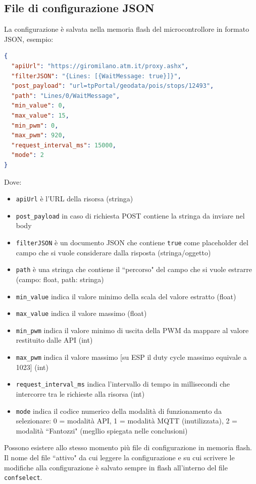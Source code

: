 \documentclass[12pt,a4paper]{report}
\begin{document}
\subsection{File di configurazione JSON}
La configurazione è salvata nella memoria flash del microcontrollore
in formato JSON, esempio:

\begin{lstlisting}[language=json,firstnumber=1]
{
  "apiUrl": "https://giromilano.atm.it/proxy.ashx",
  "filterJSON": "{Lines: [{WaitMessage: true}]}",
  "post_payload": "url=tpPortal/geodata/pois/stops/12493",
  "path": "Lines/0/WaitMessage",
  "min_value": 0,
  "max_value": 15,
  "min_pwm": 0,
  "max_pwm": 920,
  "request_interval_ms": 15000,
  "mode": 2
}
\end{lstlisting}


\noindent Dove:
\begin{itemize}
  \item \texttt{apiUrl} è l'URL della risorsa (stringa)
  \item \texttt{post_payload} in caso di richiesta POST contiene la stringa da inviare nel body
  \item \texttt{filterJSON} è un documento JSON che contiene \texttt{true} come placeholder del campo che si vuole considerare dalla risposta (stringa/oggetto)
  \item \texttt{path} è una stringa che contiene il ``percorso" del campo che si vuole estrarre (campo: float, path: stringa)
  \item \texttt{min_value} indica il valore minimo della scala del valore estratto (float)
  \item \texttt{max_value} indica il valore massimo (float)
  \item \texttt{min_pwm} indica il valore minimo di uscita della PWM da mappare al valore restituito dalle API (int)
  \item \texttt{max_pwm} indica il valore massimo [su ESP il duty cycle massimo equivale a 1023] (int)
  \item \texttt{request_interval_ms} indica l'intervallo di tempo in millisecondi che intercorre tra le richieste alla risorsa (int)
  \item \texttt{mode} indica il codice numerico della modalità di funzionamento da selezionare: 0 = modalità API, 1 = modalità MQTT (inutilizzata), 2 = modalità ``Fantozzi" (megllio spiegata nelle conclusioni)
\end{itemize}

Possono esistere allo stesso momento più file di configurazione in memoria flash. Il nome del file ``attivo" da cui leggere
la configurazione e su cui scrivere le modifiche alla configurazione è salvato sempre in flash all'interno del file \texttt{confselect}.
\end{document}
